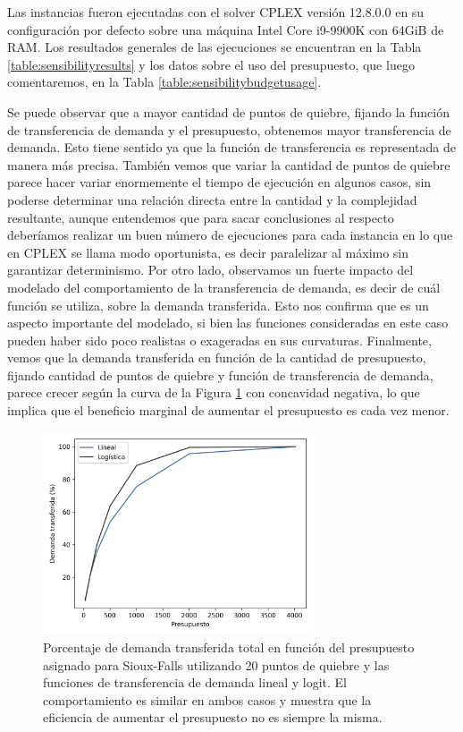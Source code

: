 Las instancias fueron ejecutadas con el solver CPLEX versión 12.8.0.0 en su configuración por defecto sobre una máquina Intel Core i9-9900K con 64GiB de RAM. Los resultados generales de las ejecuciones se encuentran en la Tabla \ref{table:sensibilityresults} y los datos sobre el uso del presupuesto, que luego comentaremos, en la Tabla \ref{table:sensibilitybudgetusage}.

Se puede observar que a mayor cantidad de puntos de quiebre, fijando la función de transferencia de demanda y el presupuesto, obtenemos mayor transferencia de demanda. Esto tiene sentido ya que la función de transferencia es representada de manera más precisa. También vemos que variar la cantidad de puntos de quiebre parece hacer variar enormemente el tiempo de ejecución en algunos casos, sin poderse determinar una relación directa entre la cantidad y la complejidad resultante, aunque entendemos que para sacar conclusiones al respecto deberíamos realizar un buen número de ejecuciones para cada instancia en lo que en CPLEX se llama modo oportunista, es decir paralelizar al máximo sin garantizar determinismo. Por otro lado, observamos un fuerte impacto del modelado del comportamiento de la transferencia de demanda, es decir de cuál función se utiliza, sobre la demanda transferida. Esto nos confirma que es un aspecto importante del modelado, si bien las funciones consideradas en este caso pueden haber sido poco realistas o exageradas en sus curvaturas. Finalmente, vemos que la demanda transferida en función de la cantidad de presupuesto, fijando cantidad de puntos de quiebre y función de transferencia de demanda, parece crecer según la curva de la Figura \ref{fig:demandtransferbybudgetlinear} con concavidad negativa, lo que implica que el beneficio marginal de aumentar el presupuesto es cada vez menor.

\begin{figure}[h!]
  \centering
  \includegraphics[width=8cm]{../resources/demand_by_budget.png}
    \caption{Porcentaje de demanda transferida total en función del presupuesto asignado para Sioux-Falls utilizando 20 puntos de quiebre y las funciones de transferencia de demanda lineal y logit. El comportamiento es similar en ambos casos y muestra que la eficiencia de aumentar el presupuesto no es siempre la misma.}
  \label{fig:demandtransferbybudgetlinear}
\end{figure}

